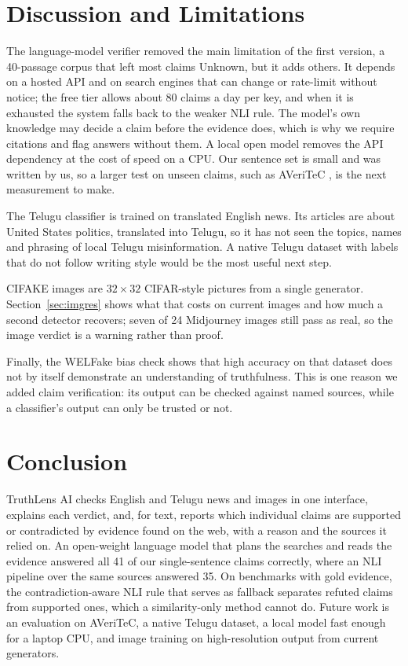 \documentclass[conference]{IEEEtran}
\begin{document}
\section{Discussion and Limitations}

The language-model verifier removed the main limitation of the first version, a 40-passage corpus that left most claims Unknown, but it adds others. It depends on a hosted API and on search engines that can change or rate-limit without notice; the free tier allows about 80 claims a day per key, and when it is exhausted the system falls back to the weaker NLI rule. The model's own knowledge may decide a claim before the evidence does, which is why we require citations and flag answers without them. A local open model removes the API dependency at the cost of speed on a CPU. Our sentence set is small and was written by us, so a larger test on unseen claims, such as AVeriTeC \cite{schlichtkrull2023averitec}, is the next measurement to make.

The Telugu classifier is trained on translated English news. Its articles are about United States politics, translated into Telugu, so it has not seen the topics, names and phrasing of local Telugu misinformation. A native Telugu dataset with labels that do not follow writing style would be the most useful next step.

CIFAKE images are $32\times32$ CIFAR-style pictures from a single generator. Section~\ref{sec:imgres} shows what that costs on current images and how much a second detector recovers; seven of 24 Midjourney images still pass as real, so the image verdict is a warning rather than proof.

Finally, the WELFake bias check shows that high accuracy on that dataset does not by itself demonstrate an understanding of truthfulness. This is one reason we added claim verification: its output can be checked against named sources, while a classifier's output can only be trusted or not.

\section{Conclusion}

TruthLens AI checks English and Telugu news and images in one interface, explains each verdict, and, for text, reports which individual claims are supported or contradicted by evidence found on the web, with a reason and the sources it relied on. An open-weight language model that plans the searches and reads the evidence answered all 41 of our single-sentence claims correctly, where an NLI pipeline over the same sources answered 35. On benchmarks with gold evidence, the contradiction-aware NLI rule that serves as fallback separates refuted claims from supported ones, which a similarity-only method cannot do. Future work is an evaluation on AVeriTeC, a native Telugu dataset, a local model fast enough for a laptop CPU, and image training on high-resolution output from current generators.



\end{document}
